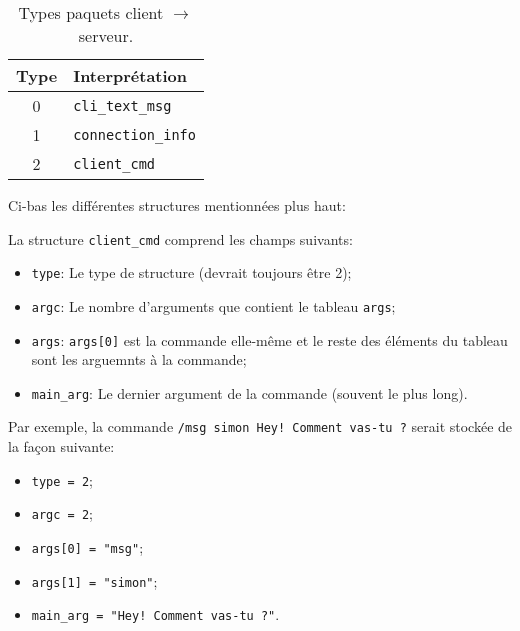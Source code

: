 \documentclass[12pt,french]{article}
\begin{document}
                \begin{table}[H]
                    \centering
                    \begin{tabular}{|c|l|}
                        \hline {\bf Type}&{\bf Interprétation}\\
                        \hline 0&{\tt cli\_text\_msg}\\
                        \hline 1&{\tt connection\_info}\\
                        \hline 2&{\tt client\_cmd}\\
                        \hline
                    \end{tabular}
                    \caption{Types paquets client $\rightarrow$ serveur.}
                \end{table}
                Ci-bas les différentes structures mentionnées plus haut:
                
                La structure {\tt client\_cmd} comprend les champs suivants:
                \begin{itemize}
                    \item {\tt type}: Le type de structure (devrait toujours être 2);
                    \item {\tt argc}: Le nombre d'arguments que contient le tableau {\tt args};
                    \item {\tt args}: {\tt args[0]} est la commande elle-même et le reste des
                        éléments du tableau sont les arguemnts à la commande;
                    \item {\tt main\_arg}: Le dernier argument de la commande (souvent le plus
                        long).
                \end{itemize}
                Par exemple, la commande {\tt /msg simon Hey! Comment vas-tu ?} serait stockée de la façon suivante:
                \begin{itemize}
                    \item {\tt type = 2};
                    \item {\tt argc = 2};
                    \item {\tt args[0] = "msg"};
                    \item {\tt args[1] = "simon"};
                    \item {\tt main\_arg = "Hey! Comment vas-tu ?"}.
                \end{itemize}
\end{document}
